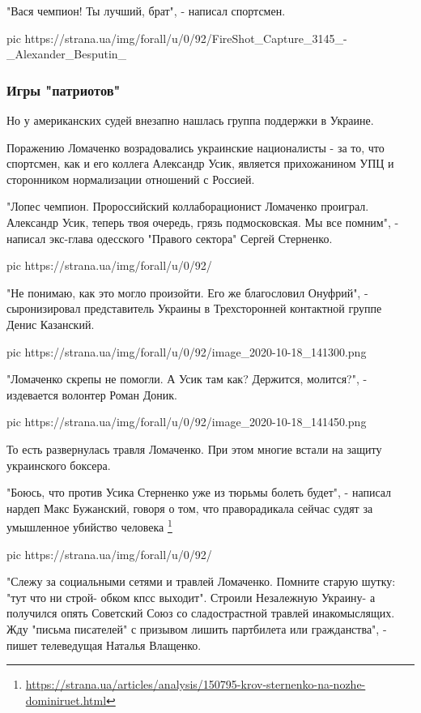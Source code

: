 "Вася чемпион! Ты лучший, брат", - написал спортсмен.

\ifcmt
pic https://strana.ua/img/forall/u/0/92/FireShot_Capture_3145_-_Alexander_Besputin_%
\fi

\subsubsection{Игры "патриотов"}

Но у американских судей внезапно нашлась группа поддержки в Украине.

Поражению Ломаченко возрадовались украинские националисты - за то, что
спортсмен, как и его коллега Александр Усик, является прихожанином УПЦ и
сторонником нормализации отношений с Россией.

"Лопес чемпион. Пророссийский коллаборационист Ломаченко проиграл. Александр
Усик, теперь твоя очередь, грязь подмосковская. Мы все помним", - написал
экс-глава одесского "Правого сектора" Сергей Стерненко. 

\ifcmt
pic https://strana.ua/img/forall/u/0/92/%
\fi

"Не понимаю, как это могло произойти. Его же благословил Онуфрий", -
сыронизировал представитель Украины в Трехсторонней контактной группе Денис
Казанский. 

\ifcmt
pic https://strana.ua/img/forall/u/0/92/image_2020-10-18_141300.png
\fi

"Ломаченко скрепы не помогли. А Усик там как? Держится, молится?", - издевается
волонтер Роман Доник. 

\ifcmt
pic https://strana.ua/img/forall/u/0/92/image_2020-10-18_141450.png
\fi

То есть развернулась травля Ломаченко. При этом многие встали на защиту
украинского боксера. 

"Боюсь, что против Усика Стерненко уже из тюрьмы болеть будет", - написал
нардеп Макс Бужанский, говоря о том, что праворадикала сейчас судят за
умышленное убийство человека 
\footnote{\url{https://strana.ua/articles/analysis/150795-krov-sternenko-na-nozhe-dominiruet.html}}

\ifcmt
pic https://strana.ua/img/forall/u/0/92/%
\fi

"Слежу за социальными сетями и травлей Ломаченко. Помните старую шутку: "тут
что ни строй- обком кпсс выходит". Строили Незалежную Украину- а получился
опять Советский Союз со сладострастной травлей инакомыслящих. Жду "письма
писателей" с призывом лишить партбилета или гражданства", - пишет телеведущая
Наталья Влащенко.

